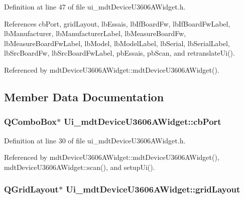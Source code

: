 Definition at line 47 of file ui\-\_\-mdt\-Device\-U3606\-A\-Widget.\-h.



References cb\-Port, grid\-Layout, lb\-Essais, lb\-If\-Board\-Fw, lb\-If\-Board\-Fw\-Label, lb\-Manufacturer, lb\-Manufacturer\-Label, lb\-Measure\-Board\-Fw, lb\-Measure\-Board\-Fw\-Label, lb\-Model, lb\-Model\-Label, lb\-Serial, lb\-Serial\-Label, lb\-Src\-Board\-Fw, lb\-Src\-Board\-Fw\-Label, pb\-Essais, pb\-Scan, and retranslate\-Ui().



Referenced by mdt\-Device\-U3606\-A\-Widget\-::mdt\-Device\-U3606\-A\-Widget().



\subsection{Member Data Documentation}
\hypertarget{class_ui__mdt_device_u3606_a_widget_a51ce31dee140a06dbbf5c855c4663a2f}{
\subsubsection[{cb\-Port}]{\setlength{\rightskip}{0pt plus 5cm}Q\-Combo\-Box$\ast$ Ui\-\_\-mdt\-Device\-U3606\-A\-Widget\-::cb\-Port}}\label{class_ui__mdt_device_u3606_a_widget_a51ce31dee140a06dbbf5c855c4663a2f}


Definition at line 30 of file ui\-\_\-mdt\-Device\-U3606\-A\-Widget.\-h.



Referenced by mdt\-Device\-U3606\-A\-Widget\-::mdt\-Device\-U3606\-A\-Widget(), mdt\-Device\-U3606\-A\-Widget\-::scan(), and setup\-Ui().

\hypertarget{class_ui__mdt_device_u3606_a_widget_a871b058c9e2947eb66cec371a748fb46}{
\subsubsection[{grid\-Layout}]{\setlength{\rightskip}{0pt plus 5cm}Q\-Grid\-Layout$\ast$ Ui\-\_\-mdt\-Device\-U3606\-A\-Widget\-::grid\-Layout}}\label{class_ui__mdt_device_u3606_a_widget_a871b058c9e2947eb66cec371a748fb46}



